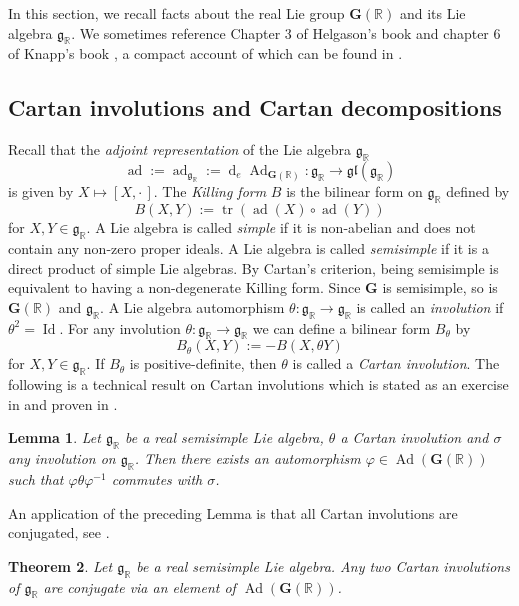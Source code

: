 \documentclass[12pt]{amsart}
\newcommand{\R}{\mathbb{R} }
\newcommand{\frakg}{\mathfrak{g}}
\newcommand{\bG}{\mathbf{G}}
\numberwithin{equation}{section}
\newtheorem{theorem}{Theorem}[section]
\newtheorem{lemma}[theorem]{Lemma}
\theoremstyle{remark} %
\begin{document}
In this section, we recall facts about the real Lie group $\bG(\R)$ and its Lie algebra $\frakg_\R$. We sometimes reference Chapter 3 of Helgason's book \cite{Hel2} and chapter 6 of Knapp's book \cite{Kna}, a compact account of which can be found in \cite{Wis01}.

\subsection{Cartan involutions and Cartan decompositions}\label{sec:killing_involutions_decompositions}

Recall that the \emph{adjoint representation} of the Lie algebra $\frakg_\R$ 
$$
\operatorname{ad} := \operatorname{ad}_{\frakg_\R} := \operatorname{d}_e\!\operatorname{Ad}_{\bG(\R)} \colon \frakg_\R \to \mathfrak{gl}(\frakg_\R)
$$
is given by $X \mapsto [X,\cdot\,]$. The \emph{Killing form} $B$ is the bilinear form on $\frakg_\R$ defined by
$$
B(X,Y) := \operatorname{tr}\left(\operatorname{ad}(X)\circ\operatorname{ad}(Y)\right)
$$
for $X,Y \in \frakg_\R$.
A Lie algebra is called \emph{simple} if it is non-abelian and does not contain any non-zero proper ideals. 
A Lie algebra is called \emph{semisimple} if it is a direct product of simple Lie algebras. By Cartan's criterion, being semisimple is equivalent to having a non-degenerate Killing form.
 Since $\bG$ is semisimple, so is $\bG(\R)$ and $\frakg_\R$.
A Lie algebra automorphism $\theta \colon \frakg_\R \to \frakg_\R$ is called an \emph{involution} if $\theta^2 = \operatorname{Id}$. For any involution $\theta \colon \frakg_\R \to \frakg_\R$ we can define a bilinear form $B_\theta$ by
$$
B_\theta(X,Y) := -B(X,\theta Y)
$$ 
for $X,Y \in \frakg_\R$. If $B_\theta$ is positive-definite, then $\theta$ is called a \emph{Cartan involution}. The following is a technical result on Cartan involutions which is stated as an exercise in \cite{Hel2} and proven in \cite[Theorem 6.16]{Kna}.
\begin{lemma} \label{lem:aligntheta}
	Let $\frakg_\R$ be a real semisimple Lie algebra, $\theta$ a Cartan involution and $\sigma$ any involution on $\frakg_\R$. Then there exists an automorphism
	$
	\varphi \in \operatorname{Ad}(\bG(\R)) 
	$
	such that $\varphi \theta \varphi^{-1}$ commutes with $\sigma$.
\end{lemma}
An application of the preceding Lemma is that all Cartan involutions are conjugated, see \cite[Corollary 6.19]{Kna}.
\begin{theorem}\label{thm:cartan_inv_unique}
	Let $\frakg_\R$ be a real semisimple Lie algebra. Any two Cartan involutions of $\frakg_\R$ are conjugate via an element of $\operatorname{Ad}(\bG(\R))$.
\end{theorem}
\end{document}
